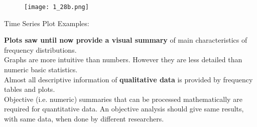 \begin{frame}
\begin{figure}
    \centering
    \texttt{[image: 1\_28b.png]} \qquad \qquad
  \end{figure}
  Time Series Plot Examples:\\

\end{frame}

\begin{frame}
  \vspace*{.4cm}
  \textbf{Plots saw until now provide a visual summary} of main characteristics of frequency distributions.\\
  \vspace*{.4cm}
  Graphs are more intuitive than numbers. However they are less detailed than numeric basic statistics.\\
  \vspace*{.4cm}
  Almost all descriptive information of \textbf{qualitative data} is provided by frequency tables and plots.\\
  \vspace*{.4cm}
  Objective (i.e. numeric) summaries that can be processed mathematically are required for quantitative data. An objective analysis should give same results, with same data, when done by different researchers.
\end{frame}




